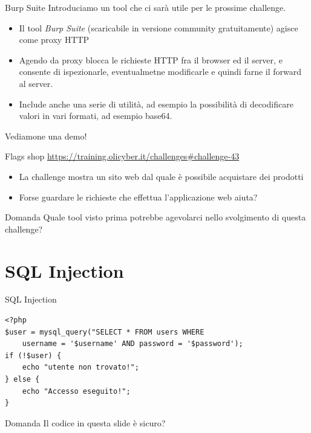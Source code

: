 \documentclass[12pt,handout]{beamer}
\begin{document}
\begin{frame}{Burp Suite}
    Introduciamo un tool che ci sarà utile per le prossime challenge. 
    \vfill
\begin{itemize}
    \item Il tool \textit{Burp Suite} (scaricabile in versione community gratuitamente) agisce 
        come proxy HTTP
    \item Agendo da proxy blocca le richieste HTTP fra il browser ed il server, e consente di ispezionarle, eventualmetne modificarle e quindi farne il forward al server.
    \item Include anche una serie di utilità, ad esempio la possibilità di decodificare valori in vari formati, ad esempio base64.
\end{itemize}
    \vfill
    Vediamone una demo!
\end{frame}

\begin{frame}{Flags shop}
    \url{https://training.olicyber.it/challenges\#challenge-43}
    \vfill
    \begin{itemize}
        \item La challenge mostra un sito web dal quale è possibile acquistare dei prodotti
        \pause
        \item Forse guardare le richieste che effettua l'applicazione web aiuta?
    \end{itemize}
    \vfill
    \begin{exampleblock}{Domanda}
        Quale tool visto prima potrebbe agevolarci nello svolgimento di questa challenge?
    \end{exampleblock}
\end{frame}


\section{SQL Injection}
\begin{frame}[fragile]{SQL Injection}
\begin{verbatim}
<?php
$user = mysql_query("SELECT * FROM users WHERE 
    username = '$username' AND password = '$password');
if (!$user) {
    echo "utente non trovato!";
} else {
    echo "Accesso eseguito!";
}
\end{verbatim}
\vfill
\begin{exampleblock}{Domanda}
    Il codice in questa slide è sicuro?
\end{exampleblock}
\end{frame}
\end{document}
